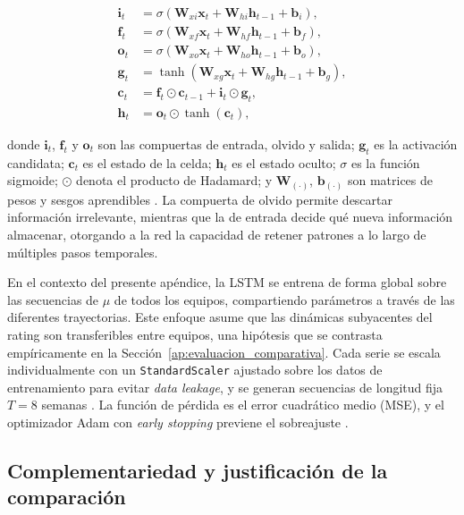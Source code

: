 \begin{align}
	\mathbf{i}_t &= \sigma(\mathbf{W}_{xi}\mathbf{x}_t + \mathbf{W}_{hi}\mathbf{h}_{t-1} + \mathbf{b}_i), \label{eq:lstm_input}\\
	\mathbf{f}_t &= \sigma(\mathbf{W}_{xf}\mathbf{x}_t + \mathbf{W}_{hf}\mathbf{h}_{t-1} + \mathbf{b}_f), \label{eq:lstm_forget}\\
	\mathbf{o}_t &= \sigma(\mathbf{W}_{xo}\mathbf{x}_t + \mathbf{W}_{ho}\mathbf{h}_{t-1} + \mathbf{b}_o), \label{eq:lstm_output}\\
	\mathbf{g}_t &= \tanh(\mathbf{W}_{xg}\mathbf{x}_t + \mathbf{W}_{hg}\mathbf{h}_{t-1} + \mathbf{b}_g), \label{eq:lstm_candidate}\\
	\mathbf{c}_t &= \mathbf{f}_t \odot \mathbf{c}_{t-1} + \mathbf{i}_t \odot \mathbf{g}_t, \label{eq:lstm_cell}\\
	\mathbf{h}_t &= \mathbf{o}_t \odot \tanh(\mathbf{c}_t), \label{eq:lstm_hidden}
\end{align}

donde $\mathbf{i}_t$, $\mathbf{f}_t$ y $\mathbf{o}_t$ son las compuertas de entrada, olvido y salida; $\mathbf{g}_t$ es la activaci\'on candidata; $\mathbf{c}_t$ es el estado de la celda; $\mathbf{h}_t$ es el estado oculto; $\sigma$ es la funci\'on sigmoide; $\odot$ denota el producto de Hadamard; y $\mathbf{W}_{(\cdot)}$, $\mathbf{b}_{(\cdot)}$ son matrices de pesos y sesgos aprendibles \cite{brockwell2002}. La compuerta de olvido permite descartar informaci\'on irrelevante, mientras que la de entrada decide qu\'e nueva informaci\'on almacenar, otorgando a la red la capacidad de retener patrones a lo largo de m\'ultiples pasos temporales.

En el contexto del presente ap\'endice, la LSTM se entrena de forma global sobre las secuencias de $\mu$ de todos los equipos, compartiendo par\'ametros a trav\'es de las diferentes trayectorias. Este enfoque asume que las din\'amicas subyacentes del rating son transferibles entre equipos, una hip\'otesis que se contrasta emp\'iricamente en la Secci\'on~\ref{ap:evaluacion_comparativa}. Cada serie se escala individualmente con un \texttt{StandardScaler} ajustado sobre los datos de entrenamiento para evitar \textit{data leakage}, y se generan secuencias de longitud fija $T=8$ semanas \cite{shumway2006}. La funci\'on de p\'erdida es el error cuadr\'atico medio (MSE), y el optimizador Adam con \textit{early stopping} previene el sobreajuste \cite{hochreiter1997}.

\subsection{Complementariedad y justificaci\'on de la comparaci\'on}
\label{ap:comparacion_teorica}


